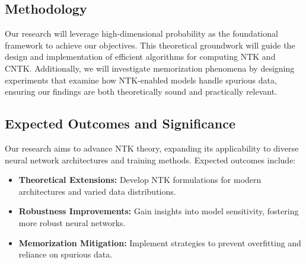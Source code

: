 \documentclass[12pt]{article}
\begin{document}
\subsection{Methodology}
Our research will leverage high-dimensional probability as the foundational framework to achieve our objectives. This theoretical groundwork will guide the design and implementation of efficient algorithms for computing NTK and CNTK. Additionally, we will investigate memorization phenomena by designing experiments that examine how NTK-enabled models handle spurious data, ensuring our findings are both theoretically sound and practically relevant. 


\subsection{Expected Outcomes and Significance}
Our research aims to advance NTK theory, expanding its applicability to diverse neural network architectures and training methods. Expected outcomes include:

\begin{itemize}
    \item \textbf{Theoretical Extensions:} Develop NTK formulations for modern architectures and varied data distributions.
    \item \textbf{Robustness Improvements:} Gain insights into model sensitivity, fostering more robust neural networks.
    \item \textbf{Memorization Mitigation:} Implement strategies to prevent overfitting and reliance on spurious data.
\end{itemize}


% 
% 
\end{document}
